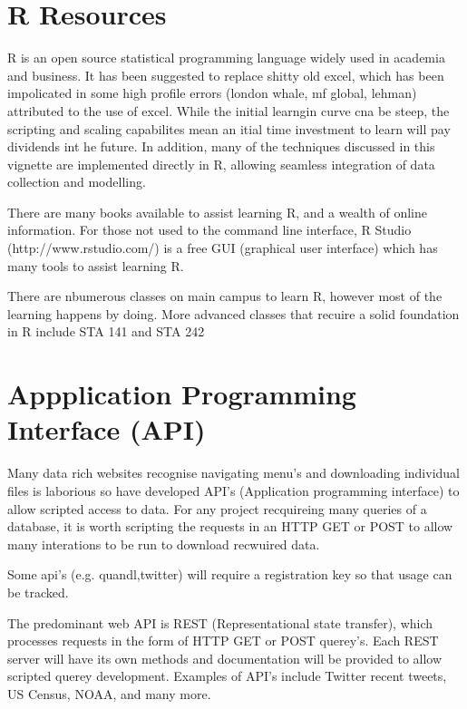 \documentclass[11pt]{article}
\begin{document}
\newpage

\appendix
\appendixpage
\addappheadtotoc
	
\section{R Resources} \label{app:mod}
	R is an open source statistical programming language widely used in academia and business.
	It has been suggested to replace shitty old excel, which has been impolicated in some high profile errors (london whale, mf global, lehman) attributed to the use of excel\cite{excel13}.
	While the initial learngin curve cna be steep, the scripting and scaling capabilites mean an itial time investment to learn will pay dividends int he future.
	In addition, many of the techniques discussed in this vignette are implemented directly in R, allowing seamless integration of data collection and modelling.


	There are many books available to assist learning R, and a wealth of online information. 
	For those not used to the command line interface, R Studio (http://www.rstudio.com/) is a free GUI (graphical user interface) which has many tools to assist learning R.

	There are nbumerous classes on main campus to learn R, however most of the learning happens by doing.
	More advanced classes that recuire a solid foundation in R include STA 141 and STA 242


	\section{Appplication Programming Interface (API)}\label{api}
	Many data rich websites recognise navigating menu's and downloading individual files is laborious so have developed API's (Application programming interface) to allow scripted access to data.
	For any project recquireing many queries of a database, it is worth scripting the requests in an HTTP GET or POST to allow many interations to be run to download recwuired data.

	Some api's (e.g. quandl,twitter) will require a registration key so that usage can be tracked.


	The predominant web API is REST (Representational state transfer), which processes requests in the form of HTTP GET or POST querey's.
	Each REST server will have its own methods and documentation will be provided to allow scripted querey development.
	Examples of API's include Twitter recent tweets, US Census, NOAA, and many more.
\end{document}
